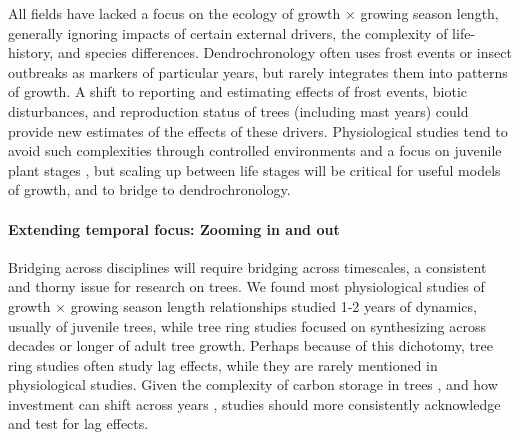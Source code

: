 \documentclass[11pt]{article}
\begin{document}
All fields have lacked a focus on the ecology of growth $\times$ growing season length, generally ignoring impacts of certain external drivers, the complexity of life-history, and species differences. Dendrochronology often uses frost events or insect outbreaks as markers of particular years, but rarely integrates them into patterns of growth. A shift to reporting and estimating effects of frost events, biotic disturbances, and reproduction status of trees (including mast years) could provide new estimates of the effects of these drivers. Physiological studies tend to avoid such complexities through controlled environments and a focus on juvenile plant stages  \citep{poorter2016pampered}, but scaling up between life stages will be critical for useful models of growth, and to bridge to dendrochronology. %

\paragraph{Extending temporal focus: Zooming in and out}%

Bridging across disciplines will require bridging across timescales, a consistent and thorny issue for research on trees. We found most physiological studies of growth $\times$ growing season length relationships studied 1-2 years of dynamics, usually of juvenile trees, while tree ring studies focused on synthesizing across decades or longer of adult tree growth. Perhaps because of this dichotomy, tree ring studies often study lag effects, while they are rarely mentioned in physiological studies. Given the complexity of carbon storage in trees \citep{finzi2020,thompson2023no,anderson2022drives}, and how investment can shift across years \citep{aubinet2018inter,doughty2014allocation}, studies should more consistently acknowledge and test for lag effects. %
\end{document}
